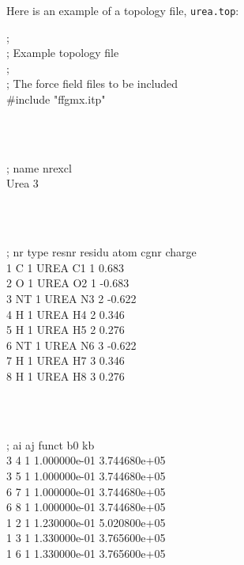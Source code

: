 Here is an example of a topology file, {\tt urea.top}:

\begin{tt}
;\\
;       Example topology file\\
;\\
; The force field files to be included\\
\#include "ffgmx.itp"\\
\end{tt}\\
\begin{tt}
[ moleculetype ]\\
; name  nrexcl\\
Urea         3\\
\end{tt}\\
\begin{tt}
[ atoms ]\\
;   nr    type   resnr  residu    atom    cgnr  charge\\
     1       C       1    UREA      C1       1   0.683\\
     2       O       1    UREA      O2       1  -0.683\\
     3      NT       1    UREA      N3       2  -0.622\\
     4       H       1    UREA      H4       2   0.346\\
     5       H       1    UREA      H5       2   0.276\\
     6      NT       1    UREA      N6       3  -0.622\\
     7       H       1    UREA      H7       3   0.346\\
     8       H       1    UREA      H8       3   0.276\\
\end{tt}\\
\begin{tt}
[ bonds ]\\
;  ai    aj funct           b0           kb\\
    3     4     1 1.000000e-01 3.744680e+05 \\
    3     5     1 1.000000e-01 3.744680e+05 \\
    6     7     1 1.000000e-01 3.744680e+05 \\
    6     8     1 1.000000e-01 3.744680e+05 \\
    1     2     1 1.230000e-01 5.020800e+05 \\
    1     3     1 1.330000e-01 3.765600e+05 \\
    1     6     1 1.330000e-01 3.765600e+05 \\
\end{tt}\\
